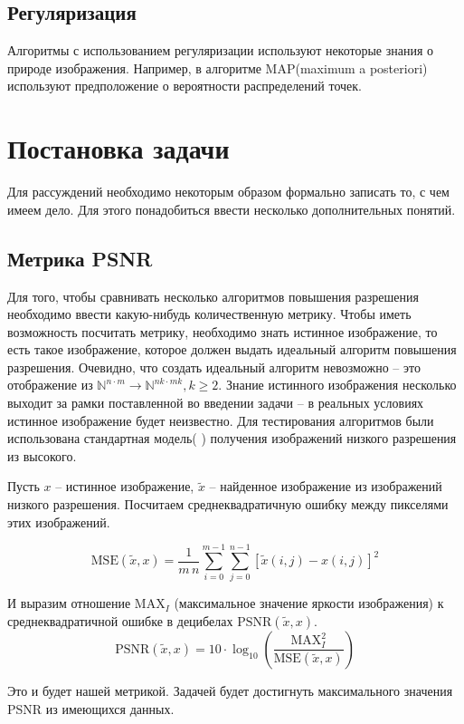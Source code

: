 \subsection{Регуляризация} Алгоритмы с использованием регуляризации используют некоторые знания о природе изображения.
Например, в алгоритме MAP(maximum a posteriori) используют предположение о вероятности распределений точек. \cite{suresh2007superresolution,yuan2008fast}

\section{Постановка задачи}
Для рассуждений необходимо некоторым образом формально записать то, с чем имеем дело. Для этого понадобиться ввести
несколько дополнительных понятий.

\subsection{Метрика PSNR}
Для того, чтобы сравнивать несколько алгоритмов повышения разрешения необходимо ввести какую-нибудь количественную
метрику. Чтобы иметь возможность посчитать метрику, необходимо знать истинное изображение, то есть такое изображение,
которое должен выдать идеальный алгоритм повышения разрешения. Очевидно, что создать идеальный алгоритм невозможно --
это отображение из $\mathbb{N}^{n \cdot m } \to \mathbb{N}^{nk \cdot mk}, k \ge 2$. Знание истинного изображения
несколько выходит за рамки поставленной во введении задачи -- в реальных условиях истинное изображение будет неизвестно.
Для тестирования алгоритмов были использована стандартная модель( \cite{suresh2007superresolution,yuan2008fast, danielyan2012bm3d}) получения изображений низкого разрешения из высокого.

Пусть $x$ -- истинное изображение, $\tilde{x}$ -- найденное изображение из изображений низкого разрешения. Посчитаем
среднеквадратичную ошибку между пикселями этих изображений.

$$ \mathrm{MSE}(\tilde{x},x) = \frac{1}{m\,n}\sum_{i=0}^{m-1}\sum_{j=0}^{n-1} [\tilde{x}(i,j) - x(i,j)]^2$$

И выразим отношение $\mathrm{MAX}_I$ (максимальное значение яркости изображения) к среднеквадратичной ошибке в
децибелах
$\mathrm{PSNR}(\tilde{x},x)$.
$$ \mathrm{PSNR}(\tilde{x},x) = 10 \cdot \log_{10} \left( \frac{\mathrm{MAX}_I^2}{\mathrm{MSE}(\tilde{x},x)} \right) $$

Это и будет нашей метрикой. Задачей будет достигнуть максимального значения PSNR из имеющихся данных.

